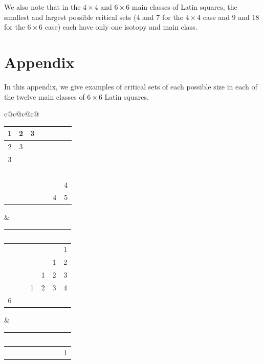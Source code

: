 We also note that in the $4 \times 4$ and $6 \times 6$ main classes of
Latin squares, the smallest and largest possible critical sets (4 and 7
for the $4 \times 4$ case and 9 and 18 for the $6 \times 6$ case) each
have only one isotopy and main class.

\section{Appendix}
In this appendix, we give examples of critical sets of each possible size 
in each of the twelve main classes of $6 \times 6$ Latin squares.
\begin{center}
\begin{tabular}{c@{\hspace{1.0mm}}c@{\hspace{1.0mm}}c@{\hspace{1.0mm}}c@{\hspace{1.0mm}}}
\begin{tabular}{|c|c|c|c|c|c|}
\hline 1 & 2 & 3 & $\;\;$ & $\;\;$ & $\;\;$ \\
\hline 2 & 3 & $\;\;$ & $\;\;$ & $\;\;$ & $\;\;$ \\
\hline 3 & $\;\;$ & $\;\;$ & $\;\;$ & $\;\;$ & $\;\;$ \\
\hline $\;\;$ & $\;\;$ & $\;\;$ & $\;\;$ & $\;\;$ & $\;\;$ \\
\hline $\;\;$ & $\;\;$ & $\;\;$ & $\;\;$ & $\;\;$ & 4 \\
\hline $\;\;$ & $\;\;$ & $\;\;$ & $\;\;$ & 4 & 5 \\
\hline 
\end{tabular} &
\begin{tabular}{|c|c|c|c|c|c|}
\hline $\;\;$ & $\;\;$ & $\;\;$ & $\;\;$ & $\;\;$ & $\;\;$ \\
\hline $\;\;$ & $\;\;$ & $\;\;$ & $\;\;$ & $\;\;$ & 1 \\
\hline $\;\;$ & $\;\;$ & $\;\;$ & $\;\;$ & 1 & 2 \\
\hline $\;\;$ & $\;\;$ & $\;\;$ & 1 & 2 & 3 \\
\hline $\;\;$ & $\;\;$ & 1 & 2 & 3 & 4 \\
\hline 6 & $\;\;$ & $\;\;$ & $\;\;$ & $\;\;$ & $\;\;$ \\
\hline 
\end{tabular} &
\begin{tabular}{|c|c|c|c|c|c|}
\hline $\;\;$ & $\;\;$ & $\;\;$ & $\;\;$ & $\;\;$ & $\;\;$ \\
\hline $\;\;$ & $\;\;$ & $\;\;$ & $\;\;$ & $\;\;$ & 1 \\

\end{tabular}
\end{tabular}
\end{center}
